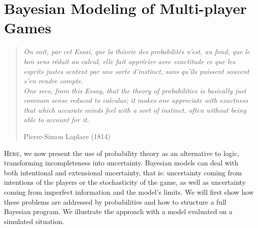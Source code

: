\chapter{Bayesian Modeling of Multi-player Games}
\chaptertoc


\begin{quotation}\textit{
On voit, par cet Essai, que la théorie des probabilités n'est, au fond, que le bon sens réduit au calcul; elle fait apprécier avec exactitude ce que les esprits justes sentent par une sorte d'instinct, sans qu'ils puissent souvent s'en rendre compte.
\vspace{0.2cm} \\
One sees, from this Essay, that the theory of probabilities is basically just common sense reduced to calculus; it makes one appreciate with exactness that which accurate minds feel with a sort of instinct, often without being able to account for it.}
\begin{flushright}Pierre-Simon Laplace (1814)\end{flushright}\end{quotation}

\lettrine{H}{ere}, we now present the use of probability theory as an alternative to logic, transforming incompleteness into uncertainty. Bayesian models can deal with both intentional and extensional uncertainty, that is: uncertainty coming from intentions of the players or the stochasticity of the game, as well as uncertainty coming from imperfect information and the model's limits. We will first show how these problems are addressed by probabilities and how to structure a full Bayesian program. We illustrate the approach with a model evaluated on a simulated  situation.


